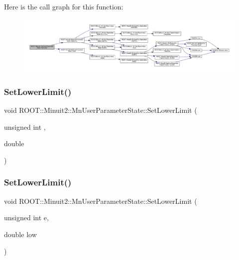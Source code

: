 Here is the call graph for this function\+:
\nopagebreak
\begin{figure}[H]
\begin{center}
\leavevmode
\includegraphics[width=350pt]{d3/de0/classROOT_1_1Minuit2_1_1MnUserParameterState_ab178dda717939b16da948c96d2180b89_cgraph}
\end{center}
\end{figure}
\mbox{\label{classROOT_1_1Minuit2_1_1MnUserParameterState_ae2601510da37a8571b0b22fe0e960b51}} 
\subsubsection{\texorpdfstring{SetLowerLimit()}{SetLowerLimit()}\hspace{0.1cm}{\footnotesize\ttfamily [1/6]}}
{\footnotesize\ttfamily void R\+O\+O\+T\+::\+Minuit2\+::\+Mn\+User\+Parameter\+State\+::\+Set\+Lower\+Limit (\begin{DoxyParamCaption}\item[{unsigned int}]{,  }\item[{double}]{ }\end{DoxyParamCaption})}

\mbox{\label{classROOT_1_1Minuit2_1_1MnUserParameterState_ae2601510da37a8571b0b22fe0e960b51}} 
\subsubsection{\texorpdfstring{SetLowerLimit()}{SetLowerLimit()}\hspace{0.1cm}{\footnotesize\ttfamily [2/6]}}
{\footnotesize\ttfamily void R\+O\+O\+T\+::\+Minuit2\+::\+Mn\+User\+Parameter\+State\+::\+Set\+Lower\+Limit (\begin{DoxyParamCaption}\item[{unsigned int}]{e,  }\item[{double}]{low }\end{DoxyParamCaption})}

